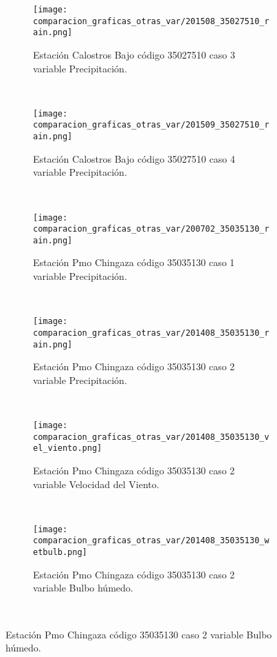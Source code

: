 \begin{figure}[H]
\centering
\begin{subfigure}[normla]{0.4\textwidth}
\caption{Estación Calostros Bajo   código 35027510 caso 3 variable Precipitación.}
\texttt{[image: comparacion\_graficas\_otras\_var/201508\_35027510\_rain.png]}
\end{subfigure}
~
\begin{subfigure}[normla]{0.4\textwidth}
\caption{Estación Calostros Bajo   código 35027510 caso 4 variable Precipitación.}
\texttt{[image: comparacion\_graficas\_otras\_var/201509\_35027510\_rain.png]}
\end{subfigure}
~
\begin{subfigure}[normla]{0.4\textwidth}
\caption{Estación Pmo Chingaza código 35035130 caso 1 variable Precipitación.}
\texttt{[image: comparacion\_graficas\_otras\_var/200702\_35035130\_rain.png]}
\end{subfigure}
~
\begin{subfigure}[normla]{0.4\textwidth}
\caption{Estación Pmo Chingaza código 35035130 caso 2 variable Precipitación.}
\texttt{[image: comparacion\_graficas\_otras\_var/201408\_35035130\_rain.png]}
\end{subfigure}
~
\begin{subfigure}[normla]{0.4\textwidth}
\caption{Estación Pmo Chingaza código 35035130 caso 2 variable Velocidad del Viento.}
\texttt{[image: comparacion\_graficas\_otras\_var/201408\_35035130\_vel\_viento.png]}
\end{subfigure}
~
\begin{subfigure}[normla]{0.4\textwidth}
\caption{Estación Pmo Chingaza código 35035130 caso 2 variable Bulbo húmedo.}
\texttt{[image: comparacion\_graficas\_otras\_var/201408\_35035130\_wetbulb.png]}
\end{subfigure}
~
\end{figure}
           
